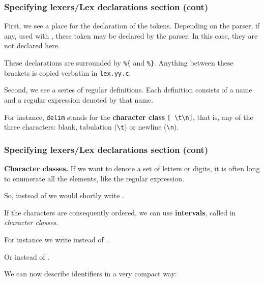 % 
\begin{frame}[containsverbatim]
\frametitle{Specifying lexers/Lex declarations section
(cont)}
 
First, we see a place for the declaration of the tokens. Depending on
the parser, if any, used with \Lex, these token may be declared by the
parser. In this case, they are not declared here.

\bigskip

These declarations are surrounded by \verb+%{+ and \verb+%}+. Anything
between these brackets is copied verbatim in \texttt{lex.yy.c}.

\bigskip

Second, we see a series of regular definitions. Each definition
consists of a name and a regular expression denoted by that name.

\bigskip

For instance, \texttt{delim} stands for the \textbf{character class}
\verb+[ \t\n]+, that is, any of the three characters: blank,
tabulation (\verb+\t+) or newline (\verb+\n+).

\end{frame}

% 
\begin{frame}
\frametitle{Specifying lexers/Lex declarations section
(cont)}

\textbf{Character classes.} If we want to denote a set of letters
or digits, it is often long to enumerate all the elements, like
the  regular expression. 

\bigskip

So, instead of  \disj {} \disj {} we would shortly
write \lb{}\rb.

\bigskip

If the characters are consequently ordered, we can use
\textbf{intervals}, called in \Lex \emph{character classes}.

\bigskip

For instance we write \lb{}\dash{}\rb{} instead
of  \disj {} \disj {}.

\bigskip

Or \lb{}\dash{}\rb{} instead of  \disj {} \disj
{} \disj {} \disj {} \disj {} \disj {} \disj
{} \disj {} \disj {}.

\bigskip

We can now describe identifiers in a very compact way:
\begin{center}
\lb{}\dash{}\dash{}\rb\lb{}\dash{}\dash{}\dash{}\rb\kleene
\end{center}

\end{frame}

